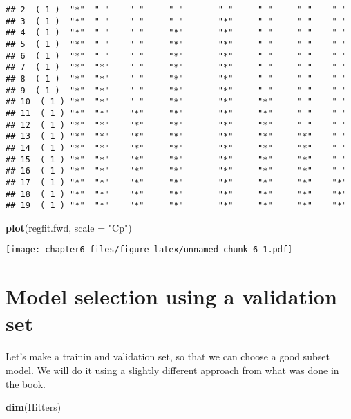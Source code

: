 \documentclass[]{article}
\newenvironment{Shaded}{\begin{snugshade}}{\end{snugshade}}
\newcommand{\KeywordTok}[1]{\textcolor[rgb]{0.13,0.29,0.53}{\textbf{#1}}}
\newcommand{\DataTypeTok}[1]{\textcolor[rgb]{0.13,0.29,0.53}{#1}}
\newcommand{\StringTok}[1]{\textcolor[rgb]{0.31,0.60,0.02}{#1}}
\newcommand{\NormalTok}[1]{#1}
\begin{document}
\begin{verbatim}
## 2  ( 1 )  "*"  " "    " "     " "       " "     " "     " "    " "       
## 3  ( 1 )  "*"  " "    " "     " "       "*"     " "     " "    " "       
## 4  ( 1 )  "*"  " "    " "     "*"       "*"     " "     " "    " "       
## 5  ( 1 )  "*"  " "    " "     "*"       "*"     " "     " "    " "       
## 6  ( 1 )  "*"  " "    " "     "*"       "*"     " "     " "    " "       
## 7  ( 1 )  "*"  "*"    " "     "*"       "*"     " "     " "    " "       
## 8  ( 1 )  "*"  "*"    " "     "*"       "*"     " "     " "    " "       
## 9  ( 1 )  "*"  "*"    " "     "*"       "*"     " "     " "    " "       
## 10  ( 1 ) "*"  "*"    " "     "*"       "*"     "*"     " "    " "       
## 11  ( 1 ) "*"  "*"    "*"     "*"       "*"     "*"     " "    " "       
## 12  ( 1 ) "*"  "*"    "*"     "*"       "*"     "*"     " "    " "       
## 13  ( 1 ) "*"  "*"    "*"     "*"       "*"     "*"     "*"    " "       
## 14  ( 1 ) "*"  "*"    "*"     "*"       "*"     "*"     "*"    " "       
## 15  ( 1 ) "*"  "*"    "*"     "*"       "*"     "*"     "*"    " "       
## 16  ( 1 ) "*"  "*"    "*"     "*"       "*"     "*"     "*"    " "       
## 17  ( 1 ) "*"  "*"    "*"     "*"       "*"     "*"     "*"    "*"       
## 18  ( 1 ) "*"  "*"    "*"     "*"       "*"     "*"     "*"    "*"       
## 19  ( 1 ) "*"  "*"    "*"     "*"       "*"     "*"     "*"    "*"
\end{verbatim}

\begin{Shaded}
\begin{Highlighting}[]
\KeywordTok{plot}\NormalTok{(regfit.fwd, }\DataTypeTok{scale =} \StringTok{"Cp"}\NormalTok{)}
\end{Highlighting}
\end{Shaded}

\texttt{[image: chapter6\_files/figure-latex/unnamed-chunk-6-1.pdf]}

\section{Model selection using a validation
set}\label{model-selection-using-a-validation-set}

Let's make a trainin and validation set, so that we can choose a good
subset model. We will do it using a slightly different approach from
what was done in the book.

\begin{Shaded}
\begin{Highlighting}[]
\KeywordTok{dim}\NormalTok{(Hitters)}
\end{Highlighting}
\end{Shaded}
\end{document}
